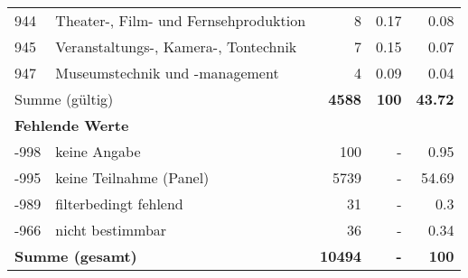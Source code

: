 \begin{longtable}{lXrrr}
        944 & \multicolumn{1}{X}{Theater-, Film- und Fernsehproduktion} & %
          \num{8} &
          \num[round-mode=places,round-precision=2]{0,17} &
          \num[round-mode=places,round-precision=2]{0,08} \\

        945 & \multicolumn{1}{X}{Veranstaltungs-, Kamera-, Tontechnik} & %
          \num{7} &
          \num[round-mode=places,round-precision=2]{0,15} &
          \num[round-mode=places,round-precision=2]{0,07} \\

        947 & \multicolumn{1}{X}{Museumstechnik und -management} & %
          \num{4} &
          \num[round-mode=places,round-precision=2]{0,09} &
          \num[round-mode=places,round-precision=2]{0,04} \\

     \midrule
     \multicolumn{2}{l}{Summe (gültig)} &
       \textbf{\num{4588}} &
     \textbf{100} &
       \textbf{\num[round-mode=places,round-precision=2]{43,72}} \\
     \multicolumn{5}{l}{\textbf{Fehlende Werte}}\\
       -998 &
       keine Angabe &
         \num{100} &
        - &
         \num[round-mode=places,round-precision=2]{0,95} \\
       -995 &
       keine Teilnahme (Panel) &
         \num{5739} &
        - &
         \num[round-mode=places,round-precision=2]{54,69} \\
       -989 &
       filterbedingt fehlend &
         \num{31} &
        - &
         \num[round-mode=places,round-precision=2]{0,3} \\
       -966 &
       nicht bestimmbar &
         \num{36} &
        - &
         \num[round-mode=places,round-precision=2]{0,34} \\
     \midrule
     \multicolumn{2}{l}{\textbf{Summe (gesamt)}} &
          \textbf{\num{10494}} &
        \textbf{-} &
        \textbf{100} \\
     \bottomrule
     \end{longtable}
     
